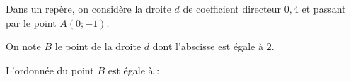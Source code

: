 
Dans un repère, on considère la droite $d$ de coefficient directeur $0{,}4$ et passant par le point $A(0;-1)$.

On note $B$ le point de la droite $d$ dont l'abscisse est égale à $2$.

L'ordonnée du point $B$ est égale à :

\smallskip
{}
